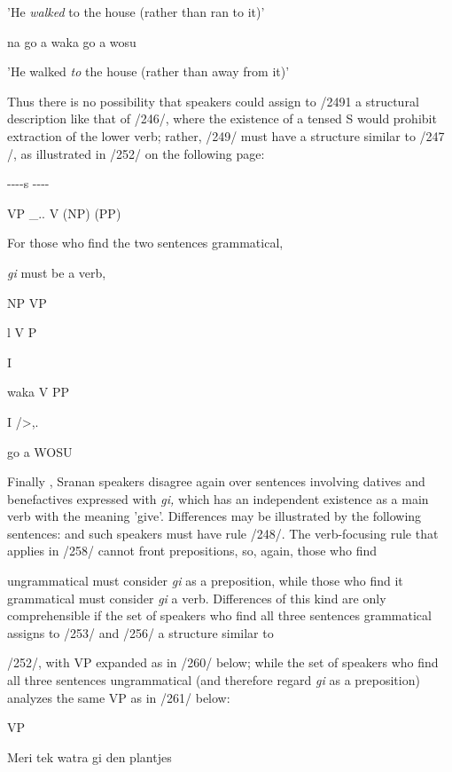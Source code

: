 'He \textit{walked} to the house (rather than ran to it)'

\ea\label{ex:251}
 na go a waka go a wosu
\glt
\z

'He walked \textit{to} the house (rather than away from it)'

Thus there is no possibility that speakers could assign to /2491 a struc\-tural description like that of /246/, where the existence of a tensed S would prohibit extraction of the lower verb; rather, /249/ must have a structure similar to /247 /, as illustrated in /252/ on the following page:


\ea\label{ex:252}
 {}-{}-{}-{}-s {}-{}-{}-{}-
\glt
\z

\ea\label{ex:259}
 VP \_.. V (NP) (PP)
\glt
\z


For those who find the two sentences grammatical,

\textit{gi} must be a verb,

NP VP

l V P

I

waka V PP

I /{\textquotedbl}{\textgreater},.

go a WOSU

Finally , Sranan speakers disagree again over sentences involving datives and benefactives expressed with \textit{gi,} which has an independent existence as a main verb with the meaning 'give'. Differences may be illustrated by the following sentences:
and such speakers must have rule /248/. The verb-focusing rule that applies in /258/ cannot front prepositions, so, again, those who find

\ea\label{ex:258}
 ungrammatical must consider \textit{gi }as a preposition, while those who find it grammatical must consider \textit{gi} a verb. Differences of this kind are only comprehensible if the set of speakers who find all three sentences grammatical assigns to /253/ and /256/ a structure similar to
\glt
\z

/252/, with VP expanded as in /260/ below; while the set of speakers who find all three sentences ungrammatical (and therefore regard \textit{gi} as a preposition) analyzes the same VP as in /261/ below:

\ea\label{ex:260}

\glt
\z

VP

\ea\label{ex:253}
 Meri tek watra gi den plantjes
\glt
\z

